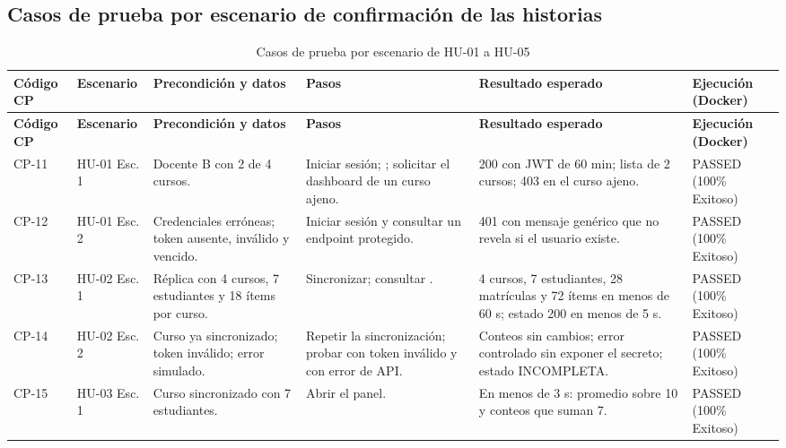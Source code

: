 \documentclass[11pt,a4paper]{article}
\newcommand{\hd}[1]{\textbf{#1}}
\begin{document}
\subsection{Casos de prueba por escenario de confirmación de las historias}
\begin{longtable}{|R{1.35cm}|R{1.5cm}|R{2.6cm}|R{3.0cm}|R{3.0cm}|R{1.7cm}|}
\caption{Casos de prueba por escenario de HU-01 a HU-05}\\
\hline \hd{Código CP} & \hd{Escenario} & \hd{Precondición y datos} & \hd{Pasos} & \hd{Resultado esperado} & \hd{Ejecución (Docker)}\\ \hline \endfirsthead
\hline \hd{Código CP} & \hd{Escenario} & \hd{Precondición y datos} & \hd{Pasos} & \hd{Resultado esperado} & \hd{Ejecución (Docker)}\\ \hline \endhead
\footnotesize CP-11 & \footnotesize HU-01 Esc. 1 & \footnotesize Docente B con 2 de 4 cursos. & \footnotesize Iniciar sesión; ; solicitar el dashboard de un curso ajeno. & \footnotesize 200 con JWT de 60 min; lista de 2 cursos; 403 en el curso ajeno. & \footnotesize PASSED (100\% Exitoso)\\ \hline
\footnotesize CP-12 & \footnotesize HU-01 Esc. 2 & \footnotesize Credenciales erróneas; token ausente, inválido y vencido. & \footnotesize Iniciar sesión y consultar un endpoint protegido. & \footnotesize 401 con mensaje genérico que no revela si el usuario existe. & \footnotesize PASSED (100\% Exitoso)\\ \hline
\footnotesize CP-13 & \footnotesize HU-02 Esc. 1 & \footnotesize Réplica con 4 cursos, 7 estudiantes y 18 ítems por curso. & \footnotesize Sincronizar; consultar . & \footnotesize 4 cursos, 7 estudiantes, 28 matrículas y 72 ítems en menos de 60 s; estado 200 en menos de 5 s. & \footnotesize PASSED (100\% Exitoso)\\ \hline
\footnotesize CP-14 & \footnotesize HU-02 Esc. 2 & \footnotesize Curso ya sincronizado; token inválido; error simulado. & \footnotesize Repetir la sincronización; probar con token inválido y con error de API. & \footnotesize Conteos sin cambios; error controlado sin exponer el secreto; estado INCOMPLETA. & \footnotesize PASSED (100\% Exitoso)\\ \hline
\footnotesize CP-15 & \footnotesize HU-03 Esc. 1 & \footnotesize Curso sincronizado con 7 estudiantes. & \footnotesize Abrir el panel. & \footnotesize En menos de 3 s: promedio sobre 10 y conteos que suman 7. & \footnotesize PASSED (100\% Exitoso)\\ \hline

\end{longtable}
\end{document}
